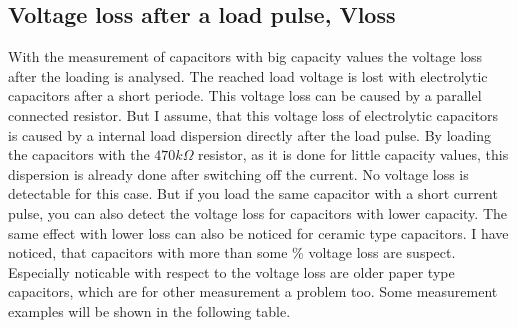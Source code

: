 \subsection{Voltage loss after a load pulse, Vloss}
With the measurement of capacitors with big capacity values the voltage loss after the loading is analysed.
The reached load voltage is lost with electrolytic capacitors after a short periode.
This voltage loss can be caused by a parallel connected resistor.
But I assume, that this voltage loss of electrolytic capacitors is caused by a internal load dispersion directly
after the load pulse. By loading the capacitors with the \(470k\Omega\) resistor, as it is done for little
capacity values, this dispersion is already done after switching off the current.
No voltage loss is detectable for this case. But if you load the same capacitor with a short current pulse,
you can also detect the voltage loss for capacitors with lower capacity.
The same effect with lower loss can also be noticed for ceramic type capacitors. 
I have noticed, that capacitors with more than some \% voltage loss are suspect.
Especially noticable with respect to the voltage loss are older paper type capacitors, which are for other measurement
a problem too. Some measurement examples will be shown in the following table.
\vspace{0.5 cm}

